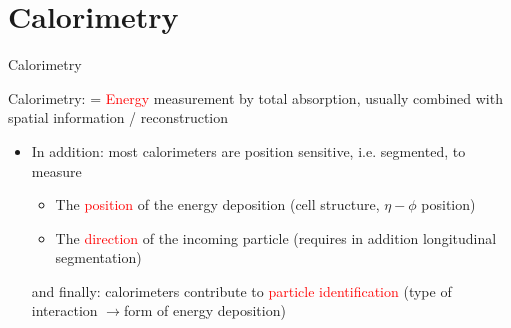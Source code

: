 \documentclass[style=husky,clock,size=9pt,dvipsnames]{powerdot}
\newcommand\ra{$\rightarrow$} %
\newcommand\myred{\textcolor{Red}} %
\begin{document}
\section{Calorimetry}
\begin{slide}[trans=Fly,toc=]{Calorimetry}
	\begin{myblock}{}
		Calorimetry: = \myred{Energy} measurement by total absorption,
		usually combined with spatial information / reconstruction
	\end{myblock}
	\begin{itemize}
		\item 
		In addition: most calorimeters are position sensitive, i.e. segmented, to measure
		\begin{itemize}
			\item The \myred{position} of the energy deposition (cell structure, $\eta-\phi$ position)
			\item The \myred{direction} of the incoming particle (requires in addition longitudinal
				segmentation)
		\end{itemize}
		and finally: calorimeters contribute to \myred{particle identification}
		(type of interaction \ra form of energy deposition)
	\end{itemize}
\end{slide}
\end{document}
